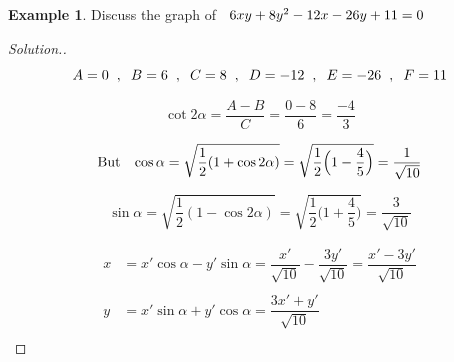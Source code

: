 \documentclass[11pt,a4paper]{article}
\theoremstyle{definition}
\newtheorem{exa}[thm]{Example}
\newenvironment{solution}
  {\renewcommand{\qedsymbol}{}\begin{proof}[\textit{Solution}.]}
  {\end{proof}}
\begin{document}
\begin{exa}


Discuss the graph of $\hspace{0.2cm}6xy + 8y^2 - 12x - 26y + 11 = 0$
\end{exa}


\begin{solution}
$$A = 0\hspace{0.2cm},\hspace{0.2cm} B = 6 \hspace{0.2cm},\hspace{0.2cm} C = 8 \hspace{0.2cm},\hspace{0.2cm} D = -12 \hspace{0.2cm},\hspace{0.2cm} E = -26 \hspace{0.2cm},\hspace{0.2cm} F = 11$$

$$\cot 2\alpha = \frac{A - B}{C} = \frac{0-8}{6} = \frac{-4}{3}$$


\begin{figure}[H]
\centering
{}
\end{figure}

 $$\text{But}\hspace{0.3cm} \cos \alpha = \sqrt{\dfrac{1}{2}(1 + \cos 2\alpha)} = \sqrt{\dfrac{1}{2}\Big( 1 - \dfrac{4}{5}\Big)} = \frac{1}{\sqrt{10}}$$

$$\sin \alpha = \sqrt{\dfrac{1}{2}(1 - \cos 2\alpha)}=\sqrt{\dfrac{1}{2}\Big(1 + \dfrac{4}{5}\Big)} = \dfrac{3}{\sqrt{10}}$$

\begin{align*}
x & = x'\cos \alpha - y'\sin \alpha = \dfrac{x'}{\sqrt{10}} - \dfrac{3y'}{\sqrt{10}}= \dfrac{x' - 3y'}{\sqrt{10}}\\\\
y & = x'\sin \alpha + y'\cos \alpha = \dfrac{3x' + y'}{\sqrt{10}}\\
\end{align*}


\end{solution}
\end{document}
